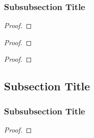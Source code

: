 \subsubsection{Subsubsection Title}

\begin{lemm}
    \lipsum[1]
\end{lemm}

\begin{proof}
    \lipsum[1]
\end{proof}

\begin{thrm}
    \lipsum[1]
\end{thrm}

\begin{proof}
    \lipsum[1]
\end{proof}

\begin{coro}
    \lipsum[1]
\end{coro}

\begin{proof}
    \lipsum[1]
\end{proof}

\subsection{Subsection Title}


\begin{defn}
    \lipsum[1]
\end{defn}

\begin{exmp}
    \lipsum[1]
\end{exmp}

\begin{rmrk}
    \lipsum[1]
\end{rmrk}

\subsubsection{Subsubsection Title}

\begin{lemm}
    \lipsum[1]
\end{lemm}

\begin{proof}
    \lipsum[1]
\end{proof}

\begin{thrm}
    \lipsum[1]
\end{thrm}

